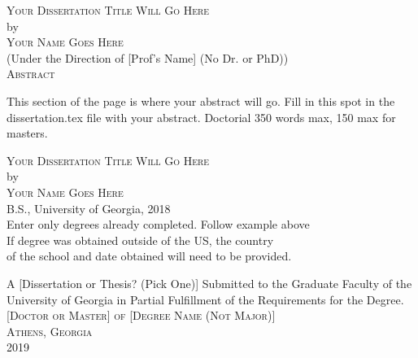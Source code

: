 \documentclass[12pt, notitlepage ]{report}
\begin{document}

\newcommand{\doctitle}{Your Dissertation Title Will Go Here}
\newcommand{\docauthor}{Your Name Goes Here}



\newpage
{}

\thispagestyle{empty}
\vspace*{18pt}
\begin{center}
  \textsc{\Large{\doctitle}}\\[18pt]  %
  by\\[18pt]
  \textsc{\Large\docauthor}\\[12pt]
  (Under the Direction of [Prof's Name] (No Dr. or PhD))\\[12pt]
  \textsc{Abstract}
\end{center}

This section of the page is where your abstract will go. Fill in this spot in the dissertation.tex file with your abstract. Doctorial 350 words max, 150 max for masters.

\thispagestyle{empty}

\begin{list}{\textsc{Index words:\hfill}}{\leftmargin 1.4in}
  \item \begin{flushleft}
  \end{flushleft}
\end{list}


\newpage
\thispagestyle{empty}
\vspace*{18pt}
\begin{center}
  \textsc{\doctitle}\\[18pt]
  by\\[12pt]
  \textsc{\docauthor}\\[8pt]
  B.S., University of Georgia, 2018\\
  Enter only degrees already completed. Follow example above\\
  If degree was obtained outside of the US, the country \\
  of the school and date obtained will need to be provided.

  \vfill
  A [Dissertation or Thesis? (Pick One)] Submitted to the Graduate Faculty of the\\ University of Georgia in Partial Fulfillment of the Requirements for the Degree.\\ [18pt]

  \textsc{[Doctor or Master] of [Degree Name (Not Major)]}\\[24pt]
  \textsc{Athens, Georgia}\\[18pt]
  2019
\end{center}
\end{document}
